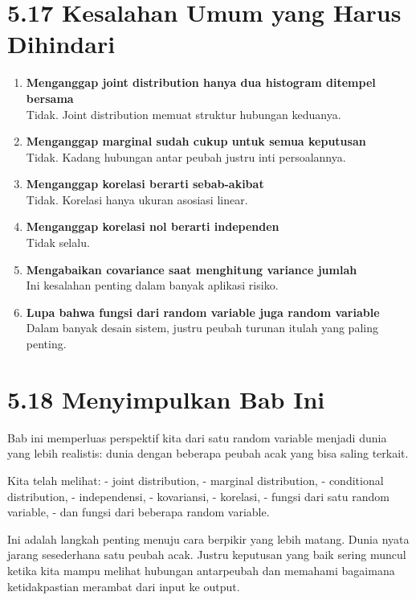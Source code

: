 \documentclass[
  letterpaper,
  DIV=11,
  numbers=noendperiod]{scrreprt}
\begin{document}
\section{5.17 Kesalahan Umum yang Harus
Dihindari}\label{kesalahan-umum-yang-harus-dihindari-2}

\begin{enumerate}
\def\labelenumi{\arabic{enumi}.}
\item
  \textbf{Menganggap joint distribution hanya dua histogram ditempel
  bersama}\\
  Tidak. Joint distribution memuat struktur hubungan keduanya.
\item
  \textbf{Menganggap marginal sudah cukup untuk semua keputusan}\\
  Tidak. Kadang hubungan antar peubah justru inti persoalannya.
\item
  \textbf{Menganggap korelasi berarti sebab-akibat}\\
  Tidak. Korelasi hanya ukuran asosiasi linear.
\item
  \textbf{Menganggap korelasi nol berarti independen}\\
  Tidak selalu.
\item
  \textbf{Mengabaikan covariance saat menghitung variance jumlah}\\
  Ini kesalahan penting dalam banyak aplikasi risiko.
\item
  \textbf{Lupa bahwa fungsi dari random variable juga random variable}\\
  Dalam banyak desain sistem, justru peubah turunan itulah yang paling
  penting.
\end{enumerate}

\section{5.18 Menyimpulkan Bab Ini}\label{menyimpulkan-bab-ini-4}

Bab ini memperluas perspektif kita dari satu random variable menjadi
dunia yang lebih realistis: dunia dengan beberapa peubah acak yang bisa
saling terkait.

Kita telah melihat: - joint distribution, - marginal distribution, -
conditional distribution, - independensi, - kovariansi, - korelasi, -
fungsi dari satu random variable, - dan fungsi dari beberapa random
variable.

Ini adalah langkah penting menuju cara berpikir yang lebih matang. Dunia
nyata jarang sesederhana satu peubah acak. Justru keputusan yang baik
sering muncul ketika kita mampu melihat hubungan antarpeubah dan
memahami bagaimana ketidakpastian merambat dari input ke output.
\end{document}
